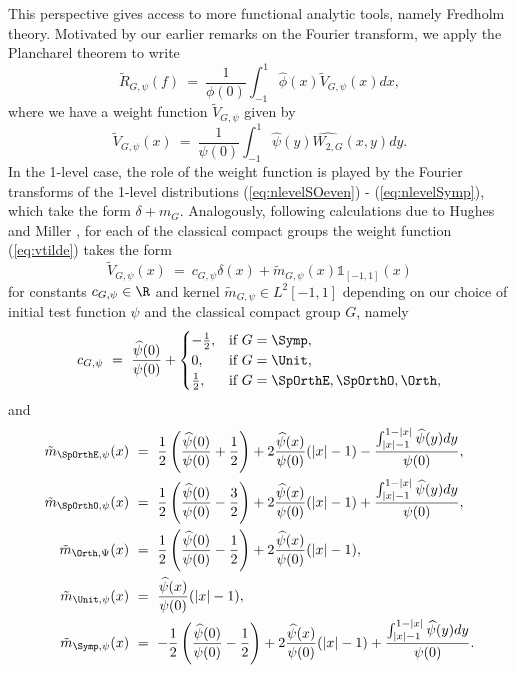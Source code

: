 \documentclass[12pt, reqno]{amsart}
\numberwithin{equation}{section}
\theoremstyle{definition}
\theoremstyle{remark}
\begin{document}
This perspective gives access to more functional analytic tools, namely Fredholm theory. Motivated by our earlier remarks on the Fourier transform, we apply the Plancharel theorem to write
	\begin{equation}
		\tilde R_{G, \psi} (f) \ = \  \frac{1}{\phi(0)} \int_{-1}^1 \widehat \phi (x) \tilde V_{G, \psi} (x) dx,
	\end{equation}	
where we have a weight function $\tilde V_{G, \psi}$ given by
	\begin{equation}
		\tilde V_{G, \psi} (x) \ = \  \frac{1}{\psi(0)}\int_{-1}^1 \widehat \psi (y) \widehat{W_{2, G}} (x, y) dy. \label{eq:vtilde}
	\end{equation}	
In the 1-level case, the role of the weight function is played by the Fourier transforms of the 1-level distributions (\ref{eq:nlevelSOeven}) - (\ref{eq:nlevelSymp}), which take the form $\delta + m_G$. Analogously, following calculations due to Hughes and Miller \cite{HughesMiller}, for each of the classical compact groups the weight function (\ref{eq:vtilde}) takes the form
	\begin{equation}
		\tilde V_{G, \psi} (x) \ = \   c_{G, \psi} \delta(x) + \tilde m_{G, \psi} (x) \mathbb 1_{[-1, 1]} (x) \label{eq:vtilde2}
	\end{equation}	
for constants $c_{G, \psi} \in \R$ and kernel $\tilde m_{G, \psi} \in L^2 [-1, 1]$ depending on our choice of initial test function $\psi$ and the classical compact group $G$, namely
	\begin{equation}
		c_{G, \psi} \ = \  \frac{\widehat \psi (0)}{\psi (0)} +
			\begin{cases}
				- \frac12, 		&\text{if } G = \Symp,\\
				0, 				&\text{if } G = \Unit, \\
				\frac12,			&\text{if } G = \SpOrthE, \SpOrthO, \Orth,
			\end{cases}
		\end{equation}
and
\begin{align}
	\tilde m_{\SpOrthE, \psi} (x)
	    &\ = \ \frac{1}{2}\left(\frac{\widehat{\psi}(0)}{\psi(0)} + \frac{1}{2}\right) + 2 \frac{\widehat{\psi}(x)}{\psi(0)}(|x|-1)-\frac{\int_{|x|-1}^{1-|x|}\widehat{\psi}(y) dy}{\psi(0)},\\
	\tilde  m_{\SpOrthO, \psi} (x)
        &\ = \  \frac{1}{2}\left(\frac{\widehat{\psi}(0)}{\psi(0)} - \frac{3}{2}\right) + 2 \frac{\widehat{\psi}(x)}{\psi(0)}(|x|-1)+\frac{\int_{|x|-1}^{1-|x|}\widehat{\psi}(y) dy}{\psi(0)},\\
	\tilde m_{\Orth, \Psi}(x)
		&\ = \  \frac{1}{2}\left(\frac{\widehat{\psi}(0)}{\psi(0)} - \frac{1}{2}\right) + 2 \frac{\widehat{\psi}(x)}{\psi(0)}(|x|-1),\\
	\tilde m_{\Unit, \psi} (x)
	    &\ = \ 	\frac{\widehat{\psi}(x)}{\psi(0)}(|x|-1),\\
	\tilde m_{\Symp, \psi} (x)
	    &\ = \ -\frac{1}{2}\left(\frac{\widehat{\psi}(0)}{\psi(0)} - \frac{1}{2}\right) + 2 \frac{\widehat{\psi}(x)}{\psi(0)}(|x|-1)+\frac{\int_{|x|-1}^{1-|x|}\widehat{\psi}(y) dy}{\psi(0)}.		
\end{align}
\end{document}
